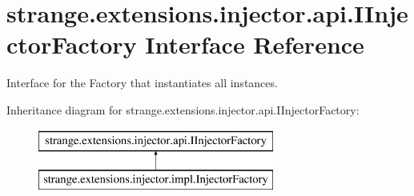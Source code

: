 \hypertarget{interfacestrange_1_1extensions_1_1injector_1_1api_1_1_i_injector_factory}{\section{strange.\-extensions.\-injector.\-api.\-I\-Injector\-Factory Interface Reference}
\label{interfacestrange_1_1extensions_1_1injector_1_1api_1_1_i_injector_factory}
}


Interface for the Factory that instantiates all instances.  


Inheritance diagram for strange.\-extensions.\-injector.\-api.\-I\-Injector\-Factory\-:\begin{figure}[H]
\begin{center}
\leavevmode
\includegraphics[height=2.000000cm]{interfacestrange_1_1extensions_1_1injector_1_1api_1_1_i_injector_factory}
\end{center}
\end{figure}
